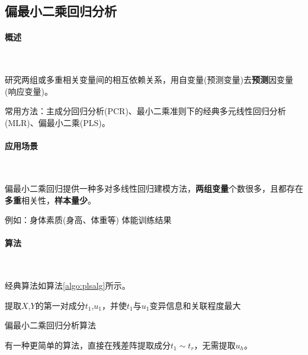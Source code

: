 \subsection{偏最小二乘回归分析}

\paragraph{概述}~{}

研究两组或多重相关变量间的相互依赖关系，用自变量(预测变量)去\textbf{预测}因变量(响应变量)。

常用方法：主成分回归分析(PCR)、最小二乘准则下的经典多元线性回归分析(MLR)、偏最小二乘(PLS)。

\paragraph{应用场景}~{}

偏最小二乘回归提供一种多对多线性回归建模方法，\textbf{两组变量}个数很多，且都存在\textbf{多重}相关性，\textbf{样本量少}。

例如：身体素质(身高、体重等) \rightarrow 体能训练结果

\paragraph{算法}~{}

经典算法如算法\ref{algo:plsalg}所示。

\begin{algorithm}[htb]
    \small
    \SetAlgoLined
  
    提取$X$,$Y$的第一对成分$t_1$,$u_1$，并使$t_1$与$u_1$变异信息和关联程度最大\;
  
    \caption{偏最小二乘回归分析算法}
    \label{algo:plsalg}
\end{algorithm}

有一种更简单的算法，直接在残差阵提取成分$t_1 \sim t_r$，无需提取$u_h$。
